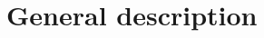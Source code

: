 \documentclass[letterpaper, 10pt, conference]{ieeeconf}  %
\begin{document}





\section{General description}\label{sec:genral}
\end{document}
